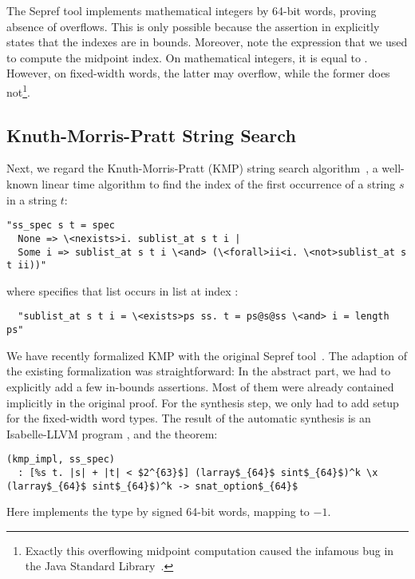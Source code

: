 \documentclass[a4paper,USenglish,cleveref, autoref]{lipics-v2019}
\begin{document}
The Sepref tool implements mathematical integers by 64-bit words, proving absence of overflows.
This is only possible because the assertion in  explicitly states that the indexes are in bounds. 
Moreover, note the expression  that we used to compute the midpoint index. 
On mathematical integers, it is equal to . However, on fixed-width words, the latter may overflow, while the former does not\footnote{Exactly this 
overflowing midpoint computation caused the infamous bug in the Java Standard Library~\cite{bs_flaw_blogpost}.}.

\subsection{Knuth-Morris-Pratt String Search}
Next, we regard the Knuth-Morris-Pratt (KMP) string search algorithm~\cite{KMP77}, a well-known 
linear time algorithm to find the index of the first occurrence of a string $s$ in a string $t$:
\begin{lstlisting}
"ss_spec s t = spec
  None => \<nexists>i. sublist_at s t i |
  Some i => sublist_at s t i \<and> (\<forall>ii<i. \<not>sublist_at s t ii))"
\end{lstlisting}
where  specifies that list  occurs in list  at index :
\begin{lstlisting}
  "sublist_at s t i = \<exists>ps ss. t = ps@s@ss \<and> i = length ps"
\end{lstlisting}


We have recently formalized KMP with the original Sepref tool~\cite{HeLa17}.
The adaption of the existing formalization was straightforward: 
In the abstract part, we had to explicitly add a few in-bounds assertions. Most of them were already contained implicitly in the original proof.
For the synthesis step, we only had to add setup for the fixed-width word types.
The result of the automatic synthesis is an Isabelle-LLVM program , and the theorem:
\begin{lstlisting}
(kmp_impl, ss_spec)
  : [%s t. |s| + |t| < $2^{63}$] (larray$_{64}$ sint$_{64}$)^k \x (larray$_{64}$ sint$_{64}$)^k -> snat_option$_{64}$
\end{lstlisting}
Here  implements the type  by signed 64-bit words, mapping  to $-1$.
\end{document}
